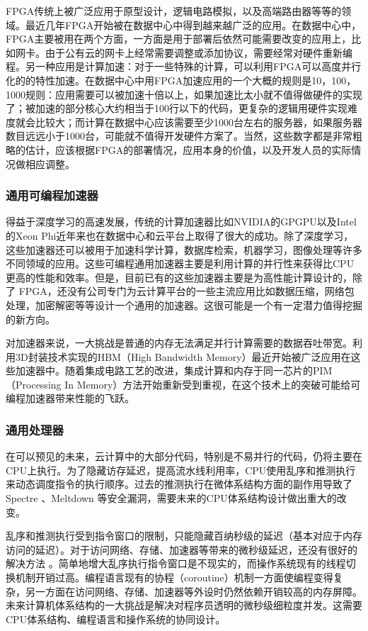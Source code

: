 FPGA传统上被广泛应用于原型设计，逻辑电路模拟，以及高端路由器等等的领域。最近几年FPGA开始被在数据中心中得到越来越广泛的应用。在数据中心中，FPGA主要被用在两个方面，一方面是用于部署后依然可能需要改变的应用上，比如网卡。由于公有云的网卡上经常需要调整或添加协议，需要经常对硬件重新编程。另一种应用是计算加速：对于一些特殊的计算，可以利用FPGA可以高度并行化的的特性加速。在数据中心中用FPGA加速应用的一个大概的规则是10，100，1000规则：应用需要可以被加速十倍以上，如果加速比太小就不值得做硬件的实现了；被加速的部分核心大约相当于100行以下的代码，更复杂的逻辑用硬件实现难度就会比较大；而计算在数据中心应该需要至少1000台左右的服务器，如果服务器数目远远小于1000台，可能就不值得开发硬件方案了。当然，这些数字都是非常粗略的估计，应该根据FPGA的部署情况，应用本身的价值，以及开发人员的实际情况做相应调整。


\subsubsection{通用可编程加速器}

得益于深度学习的高速发展，传统的计算加速器比如NVIDIA的GPGPU以及Intel的Xeon Phi近年来也在数据中心和云平台上取得了很大的成功。除了深度学习，这些加速器还可以被用于加速科学计算，数据库检索，机器学习，图像处理等许多不同领域的应用。这些可编程通用加速器主要是利用计算的并行性来获得比CPU更高的性能和效率。但是，目前已有的这些加速器主要是为高性能计算设计的，除了 FPGA，还没有公司专门为云计算平台的一些主流应用比如数据压缩，网络包处理，加密解密等等设计一个通用的加速器。这很可能是一个有一定潜力值得挖掘的新方向。

对加速器来说，一大挑战是普通的内存无法满足并行计算需要的数据吞吐带宽。利用3D封装技术实现的HBM（High Bandwidth Memory）最近开始被广泛应用在这些加速器中。随着集成电路工艺的改进，集成计算和内存于同一芯片的PIM（Processing In Memory）方法开始重新受到重视，在这个技术上的突破可能给可编程加速器带来性能的飞跃。

\subsubsection{通用处理器}

在可以预见的未来，云计算中的大部分代码，特别是不易并行的代码，仍将主要在CPU上执行。为了隐藏访存延迟，提高流水线利用率，CPU使用乱序和推测执行来动态调度指令的执行顺序。过去的推测执行在微体系结构方面的副作用导致了 Spectre \cite{Kocher2018spectre}、Meltdown \cite{Lipp2018meltdown} 等安全漏洞，需要未来的CPU体系结构设计做出重大的改变。

乱序和推测执行受到指令窗口的限制，只能隐藏百纳秒级的延迟（基本对应于内存访问的延迟）。对于访问网络、存储、加速器等带来的微秒级延迟，还没有很好的解决方法 \cite{barroso2017attack}。简单地增大乱序执行指令窗口是不现实的，而操作系统现有的线程切换机制开销过高。编程语言现有的协程（coroutine）机制一方面使编程变得复杂，另一方面在访问网络、存储、加速器等外设时仍然依赖开销较高的内存屏障。未来计算机体系结构的一大挑战是解决对程序员透明的微秒级细粒度并发。这需要CPU体系结构、编程语言和操作系统的协同设计。

